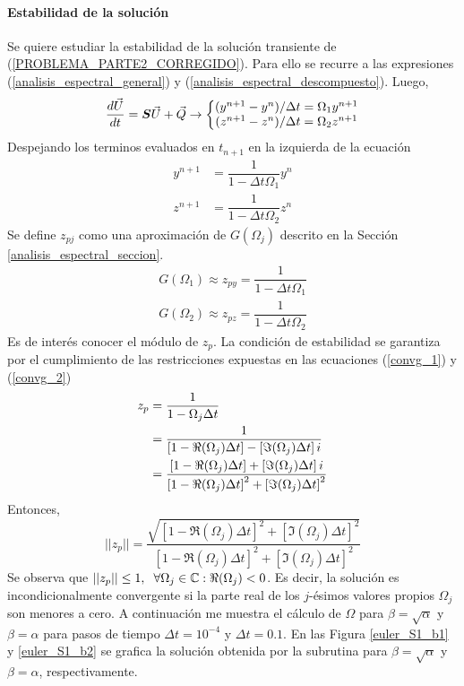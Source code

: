 \paragraph{Estabilidad de la solución}
Se quiere estudiar la estabilidad de la solución transiente de (\ref{PROBLEMA_PARTE2_CORREGIDO}). Para ello se recurre a las expresiones (\ref{analisis_espectral_general}) y (\ref{analisis_espectral_descompuesto}). Luego,
\begin{equation}
\dfrac{d \vec{U}}{d t} = \boldsymbol{S} \vec{U} + \vec{Q} \rightarrow \left\{ \begin{matrix}
( y^{n+1} - y^n ) /  \Delta t  = \Omega_1 y^{n+1} \\
( z^{n+1} - z^n ) /  \Delta t  = \Omega_2 z^{n+1}
\end{matrix} \right.
\end{equation}
Despejando los terminos evaluados en $t_{n+1}$ en la izquierda de la ecuación
\begin{align}
y^{n+1} &= \dfrac{ 1 }{ 1 - \Delta t \Omega_1 } y^n \\
z^{n+1} &= \dfrac{ 1 }{ 1 - \Delta t \Omega_2 } z^n
\end{align}
Se define $z_{pj}$ como una aproximación de $G(\Omega_j)$ descrito en la Sección \ref{analisis_espectral_seccion}. 
\begin{equation}
\begin{matrix}
G(\Omega_1) \approx z_{py} = \dfrac{ 1 }{ 1 - \Delta t \Omega_1 } \\
G(\Omega_2) \approx z_{pz} = \dfrac{ 1 }{ 1 - \Delta t \Omega_2 }
\end{matrix}
\end{equation}
Es de interés conocer el módulo de $z_p$. La condición de estabilidad se garantiza por el cumplimiento de las restricciones expuestas en las ecuaciones (\ref{convg_1}) y (\ref{convg_2})
\begin{align}
z_p &= \dfrac{1}{1-\Omega_j \Delta t} \notag \\
&= \dfrac{1}{ \left[ 1-\Re(\Omega_j) \Delta t \right] - \left[ \Im(\Omega_j) \Delta t \right] i } \notag \\
&= \dfrac{\left[ 1- \Re(\Omega_j) \Delta t \right] + \left[ \Im(\Omega_j) \Delta t \right] i }{ \left[ 1-\Re(\Omega_j) \Delta t \right]^2 + \left[ \Im(\Omega_j) \Delta t \right]^2}
\end{align}
Entonces,
\begin{equation}
||z_p|| = \dfrac{ \sqrt{ \left[ 1-\Re(\Omega_j) \Delta t \right]^2 + \left[ \Im(\Omega_j) \Delta t \right]^2 } } { \left[ 1- \Re(\Omega_j) \Delta t \right]^2 + \left[ \Im(\Omega_j) \Delta t \right]^2}
\end{equation}
Se observa que $||z_p|| \leq 1 , \hspace{0,2cm} \forall \Omega_j \in \mathbb{C} : \Re(\Omega_j)<0$. Es decir, la solución es incondicionalmente convergente si la parte real de los $j$-ésimos valores propios $\Omega_j$ son menores a cero. A continuación me muestra el cálculo de $\Omega$ para $\beta=\sqrt{\alpha}$ y $\beta=\alpha$ para pasos de tiempo $\Delta t = 10^{-4}$ y $\Delta t = 0.1$. En las Figura \ref{euler_S1_b1} y \ref{euler_S1_b2} se grafica la solución obtenida por la subrutina para $\beta=\sqrt{\alpha}$ y $\beta=\alpha$, respectivamente.  

